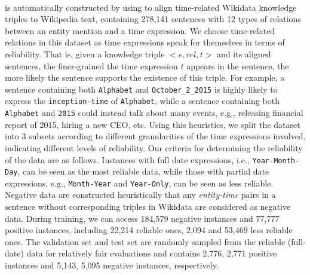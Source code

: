 \paragraph{\TimeRE}
 is automatically constructed by using \DS to align time-related Wikidata\cite{vrandevcic2014wikidata} knowledge triples to
Wikipedia text, containing 278,141 sentences with 12
types of relations  between an entity mention and a time expression.
We choose time-related relations in this dataset as time expressions speak for themselves in
terms of reliability. That is, given a knowledge triple $<$$e,rel,t$$>$ and its
aligned sentences,  the  finer-grained the time expression $t$ appears in the sentence,
the more likely the sentence  supports the existence of this triple.
For example, a sentence containing both \texttt{Alphabet} and \texttt{October\_2\_2015} is highly likely to express the \texttt{inception-time} of \texttt{Alphabet}, while a sentence containing both \texttt{Alphabet} and \texttt{2015} could instead talk  about many events, e.g.,  releasing financial report of 2015, hiring a new CEO, etc.
Using this heuristics, we split the dataset into
3 subsets according to different granularities of the time expressions involved, indicating different levels of reliability.
Our criteria for determining the reliability of the data are as follows.
Instances with full date expressions, i.e., \texttt{Year-Month-Day}, can be seen as the most reliable data, while those with
partial date expressions, e.g., \texttt{Month-Year} and \texttt{Year-Only}, can be seen as less
reliable.  Negative data are constructed  heuristically that any
\emph{entity-time} pairs in a sentence without corresponding triples in Wikidata are considered as negative data.
During training, we can access  184,579 negative
instances and  77,777 positive instances, including 22,214 reliable
ones, 2,094 and 53,469 less reliable ones. The validation set and test set are randomly sampled from
the reliable (full-date) data for relatively fair evaluations and contains
2,776, 2,771 positive instances and 5,143, 5,095 negative instances, respectively.


